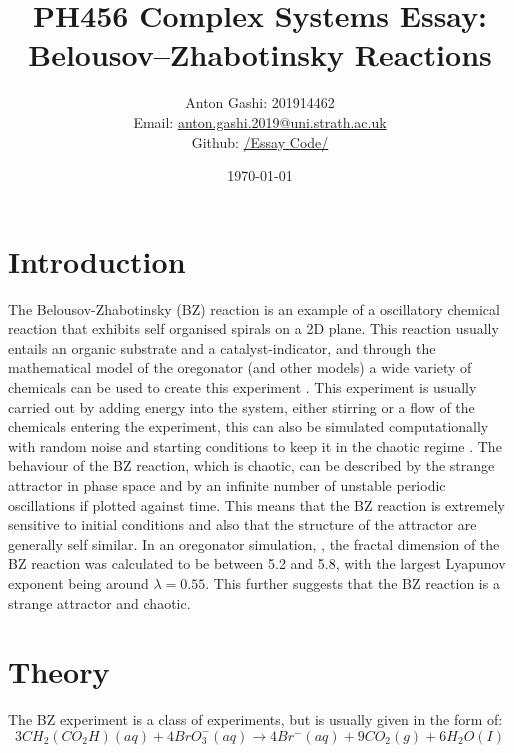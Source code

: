 \documentclass[12pt, A4]{article}
\title{PH456 Complex Systems Essay: Belousov–Zhabotinsky Reactions}
\author{Anton Gashi: 201914462 \\ Email: \href{anton.gashi.2019@uni.strath.ac.uk}{anton.gashi.2019@uni.strath.ac.uk} \\ Github: \href{https://github.com/AntonGashi/Computation_Class}{/Essay Code/}}
\date{\today}
\begin{document}
\begin{titlepage}
\clearpage\maketitle
\thispagestyle{empty}
\end{titlepage}


\section{Introduction} %
\label{sec:Introduction}

The Belousov-Zhabotinsky (BZ) reaction is an example of a oscillatory chemical 
reaction that exhibits self organised spirals on a 2D plane. 
This reaction usually entails an organic substrate and a catalyst-indicator, 
and through the mathematical model of the oregonator (and other models) a wide variety of chemicals 
can be used to create this experiment \cite{chen2000mathematical}.
This experiment is usually carried out by adding energy into the system, either 
stirring or a flow of the chemicals entering the experiment, this can also 
be simulated computationally with random noise and starting conditions to keep it in the 
chaotic regime \cite{petrov1993controlling}.
The behaviour of the BZ reaction, which is chaotic, can be described by 
the strange attractor in phase space and by an infinite number of 
unstable periodic oscillations if plotted against time. This means that the 
BZ reaction is extremely sensitive to initial conditions and also that the structure of 
the attractor are generally self similar. In an oregonator simulation, \cite{mukesh1993modelling}, 
the fractal dimension of the BZ reaction was calculated to be between 5.2 and 5.8, with 
the largest Lyapunov exponent being around $\lambda = 0.55$. This further suggests that 
the BZ reaction is a strange attractor and chaotic.


\section{Theory} %
\label{sec:Theory}

The BZ experiment is a class of experiments, but is usually given in the form of: 
\begin{equation}
  3CH_2(CO_2H)(aq)+4BrO^-_3(aq)\rightarrow 4Br^-(aq)+9CO_2(g)+6H_2O(I)
\end{equation}
\end{document}
